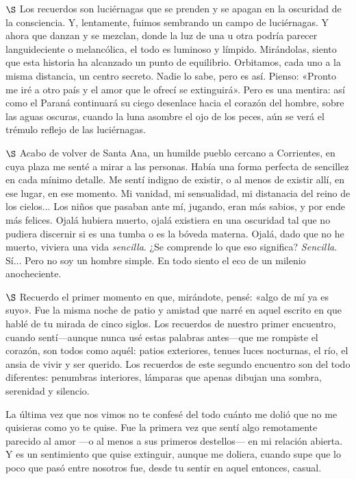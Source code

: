 \documentclass[a4paper, 12pt]{article}
\begin{document}
\newpage 



$\S$ Los recuerdos son luciérnagas que se prenden y se apagan en la oscuridad de
la consciencia. Y, lentamente, fuimos sembrando un campo de luciérnagas. Y ahora
que danzan y se mezclan, donde la luz de una u otra podría parecer
languideciente o melancólica, el todo es luminoso y límpido. Mirándolas, siento
que esta historia ha alcanzado un punto de equilibrio. Orbitamos, cada uno a la
misma distancia, un centro secreto. Nadie lo sabe, pero es así. Pienso: «Pronto
me iré a otro país y el amor que le ofrecí se extinguirá». Pero es una mentira:
así como el Paraná continuará su ciego desenlace hacia el corazón del hombre,
sobre las aguas oscuras, cuando la luna asombre el ojo de los peces, aún se verá
el trémulo reflejo de las luciérnagas.

\newpage 

$\S$ Acabo de volver de Santa Ana, un humilde pueblo cercano a Corrientes, en
cuya plaza me senté a mirar a las personas. Había una forma perfecta de
sencillez en cada mínimo detalle. Me sentí indigno de existir, o al menos de
existir allí, en ese lugar, en ese momento. Mi vanidad, mi sensualidad, mi
distanacia del reino de los cielos... Los niños que pasaban ante mí, jugando,
eran más sabios, y por ende más felices. Ojalá hubiera muerto, ojalá existiera
en una oscuridad tal que no pudiera discernir si es una tumba o es la bóveda
materna. Ojalá, dado que no he muerto, viviera una vida \textit{sencilla}. ¿Se
comprende lo que eso significa? \textit{Sencilla}. Sí... Pero no soy un hombre
simple. En todo siento el eco de un milenio anocheciente.


\pagebreak 

$\S$ Recuerdo el primer momento en que, mirándote, pensé: «algo de mí ya es
suyo». Fue la misma noche de patio y amistad que narré en aquel escrito en que
hablé de tu mirada de cinco siglos. Los recuerdos de nuestro primer encuentro,
cuando sentí---aunque nunca usé estas palabras antes---que me rompiste el
corazón, son todos como aquél: patios exteriores, tenues luces nocturnas, el
río, el ansia de vivir y ser querido. Los recuerdos de este segundo encuentro
son del todo diferentes: penumbras interiores, lámparas que apenas dibujan una
sombra, serenidad y silencio.

La última vez que nos vimos no te confesé del todo cuánto me dolió que no me
quisieras como yo te quise. Fue la primera vez que sentí algo remotamente
parecido al amor ---o al menos a sus primeros destellos--- en mi relación
abierta. Y es un sentimiento que quise extinguir, aunque me doliera, cuando supe
que lo poco que pasó entre nosotros fue, desde tu sentir en aquel entonces,
casual. 
\end{document}
